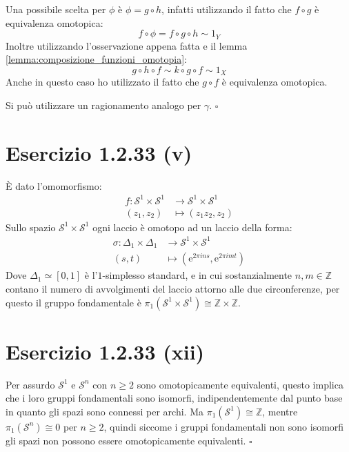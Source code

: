 \documentclass[10pt]{scrartcl}
\newcommand{\Z}{\mathbb{Z}}
\newcommand{\Sph}[1][]{\mathcal{S}^#1}
\begin{document}
Una possibile scelta per $ \phi $ è $ \phi = g \circ h $, infatti utilizzando
il fatto che $ f \circ g $ è equivalenza omotopica:
\[
  f \circ \phi = f \circ g \circ h \sim 1_Y
\]
Inoltre utilizzando l'osservazione appena fatta e il lemma
\ref{lemma:composizione_funzioni_omotopia}:
\[
  g \circ h \circ f \sim k \circ g \circ f \sim 1_X
\]
Anche in questo caso ho utilizzato il fatto che $ g \circ f $ è equivalenza
omotopica.

Si può utilizzare un ragionamento analogo per $ \gamma $.
\hfill $ \square $

\section*{Esercizio 1.2.33 (v)}
È dato l'omomorfismo:
\begin{align*}
  f \colon \Sph{1} \times \Sph{1} & \to  \Sph{1} \times \Sph{1} \\
  (z_1, z_2) & \mapsto (z_1 z_2, z_2)
\end{align*}
Sullo spazio $ \Sph{1} \times \Sph{1} $ ogni laccio è
omotopo ad un laccio della forma:
\begin{align*}
  \sigma \colon \Delta_1 \times \Delta_1 & \to \Sph{1} \times \Sph{1} \\
  (s,t) & \mapsto (\mathrm{e}^{2 \pi i n s}, \mathrm{e}^{2 \pi i m t})
\end{align*}
Dove $ \Delta_1 \simeq [0,1] $ è l'$ 1 $-simplesso standard, e in
cui sostanzialmente $ n, m \in \Z $ contano il numero
di avvolgimenti del laccio attorno alle due circonferenze,
per questo il gruppo fondamentale è $ \pi_1(\Sph{1} \times \Sph{1})
\cong \Z \times \Z $.

\section*{Esercizio 1.2.33 (xii)}
Per assurdo $ \Sph{1} $ e $ \Sph{n} $ con $ n \geq 2 $ sono omotopicamente
equivalenti, questo implica che i loro gruppi fondamentali sono isomorfi,
indipendentemente dal punto base in quanto gli spazi sono connessi per archi.
Ma $ \pi_1(\Sph{1}) \cong \Z $, mentre $ \pi_1(\Sph{n}) \cong 0 $ per $ n \geq 2 $, quindi
siccome i gruppi fondamentali non sono isomorfi gli spazi non possono
essere omotopicamente equivalenti.
\hfill $ \square $
\end{document}
